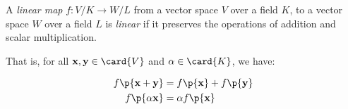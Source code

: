 \begin{definition}

A \emph{linear map} $f: V/K \rightarrow W/L$ from a vector space $V$ over a
field $K$, to a vector space $W$ over a field $L$ is \emph{linear} if it
preserves the operations of addition and scalar multiplication.

That is, for all $\mathbf{x}, \mathbf{y} \in \card{V}$ and $\alpha \in
\card{K}$, we have:

\begin{align}
f\p{\mathbf{x}+\mathbf{y}} &= f\p{\mathbf{x}} + f\p{\mathbf{y}}\\
f\p{\alpha \mathbf{x}} &= \alpha f\p{\mathbf{x}}
\end{align}

\end{definition}
